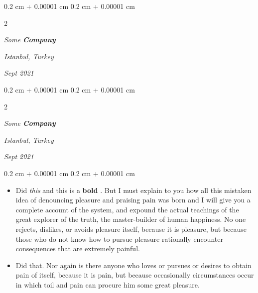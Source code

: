 \documentclass[10pt, letterpaper]{article}
\newenvironment{highlights}{
    \begin{itemize}[
        topsep=0.10 cm,
        parsep=0.10 cm,
        partopsep=0pt,
        itemsep=0pt,
        leftmargin=0.4 cm + 10pt
    ]
}{
    \end{itemize}
} %
\newenvironment{onecolentry}{
    \begin{adjustwidth}{
        0.2 cm + 0.00001 cm
    }{
        0.2 cm + 0.00001 cm
    }
}{
    \end{adjustwidth}
} %
\newenvironment{twocolentry}[2][]{
    \onecolentry
    \def\secondColumn{#2}
    \setcolumnwidth{\fill, 4.5 cm}
    \begin{paracol}{2}
}{
    \switchcolumn \raggedleft \secondColumn
    \end{paracol}
    \endonecolentry
} %
\let\hrefWithoutArrow\href
\renewcommand{\href}[2]{\hrefWithoutArrow{#1}{\ifthenelse{\equal{#2}{}}{ }{#2 }\raisebox{.15ex}{\footnotesize \faExternalLink*}}}
\begin{document}
        \vspace{0.2 cm}

            \begin{twocolentry}{
        \textit{Istanbul, Turkey}

        \textit{Sept 2021}    }
                \textbf{}

                \textit{Some \textbf{Company}}
            \end{twocolentry}



        \vspace{0.2 cm}

            \begin{twocolentry}{
        \textit{Istanbul, Turkey}

        \textit{Sept 2021}    }
                \textbf{}

                \textit{Some \textbf{Company}}
            \end{twocolentry}

        \vspace{0.10 cm}
        \begin{onecolentry}
            \begin{highlights}
                \item Did \textit{this} and this is a \textbf{bold} \href{https://example.com}{link}. But I must explain to you how all this mistaken idea of denouncing pleasure and praising pain was born and I will give you a complete account of the system, and expound the actual teachings of the great explorer of the truth, the master-builder of human happiness. No one rejects, dislikes, or avoids pleasure itself, because it is pleasure, but because those who do not know how to pursue pleasure rationally encounter consequences that are extremely painful.
                \item Did that. Nor again is there anyone who loves or pursues or desires to obtain pain of itself, because it is pain, but because occasionally circumstances occur in which toil and pain can procure him some great pleasure.
            \end{highlights}
        \end{onecolentry}
\end{document}
